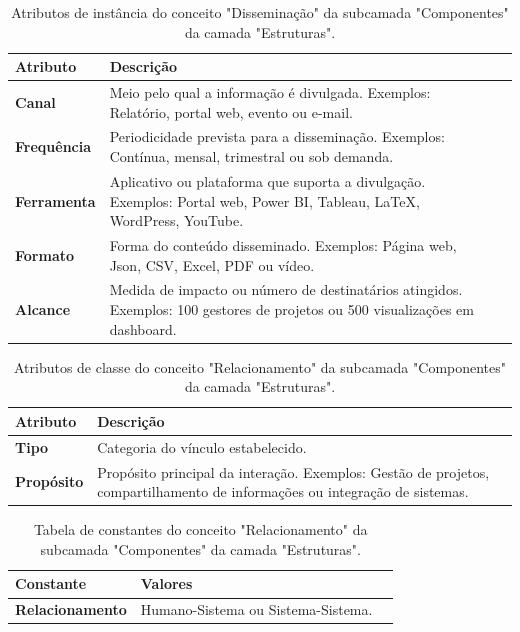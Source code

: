 \begin{apendicesenv}
\begin{table}[H]
\centering
\caption{Atributos de instância do conceito "Disseminação" da subcamada "Componentes" da camada "Estruturas".}
\begin{tabularx}{\textwidth}{|l|X|X|}
\hline
\textbf{Atributo} & \textbf{Descrição} \\ \hline
\textbf{Canal} & Meio pelo qual a informação é divulgada. Exemplos: Relatório, portal web, evento ou e-mail. \\ \hline
\textbf{Frequência} & Periodicidade prevista para a disseminação. Exemplos: Contínua, mensal, trimestral ou sob demanda. \\ \hline
\textbf{Ferramenta} & Aplicativo ou plataforma que suporta a divulgação. Exemplos: Portal web, Power BI, Tableau, LaTeX, WordPress, YouTube. \\ \hline
\textbf{Formato}  & Forma do conteúdo disseminado. Exemplos: Página web, Json, CSV, Excel, PDF ou vídeo. \\ \hline
\textbf{Alcance} & Medida de impacto ou número de destinatários atingidos. Exemplos: 100 gestores de projetos ou 500 visualizações em dashboard. \\ \hline
\end{tabularx}
\end{table}

\begin{table}[H]
\centering
\caption{Atributos de classe do conceito "Relacionamento" da subcamada "Componentes" da camada "Estruturas".}
\begin{tabularx}{\textwidth}{|l|X|X|}
\hline
\textbf{Atributo} & \textbf{Descrição} \\ \hline
\textbf{Tipo} & Categoria do vínculo estabelecido. \\ \hline
\textbf{Propósito} & Propósito principal da interação. Exemplos: Gestão de projetos, compartilhamento de informações ou integração de sistemas. \\ \hline
\end{tabularx}
\end{table}

\begin{table}[H]
\centering
\caption{Tabela de constantes do conceito "Relacionamento" da subcamada "Componentes" da camada "Estruturas".}
\begin{tabularx}{\textwidth}{|l|X|X|}
\hline
\textbf{Constante} & \textbf{Valores} \\ \hline
\textbf{Relacionamento} & Humano-Sistema ou Sistema-Sistema. \\ \hline
\end{tabularx}
\end{table}


\end{apendicesenv}
